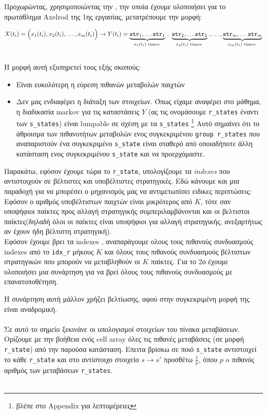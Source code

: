 	Προχωρώντας, χρησιμοποιώντας την  , την οποία έχουμε υλοποιήσει για το πρωτάθλημα Axelrod της 1ης εργασίας, μετατρέπουμε την μορφή:
	
	\[X(t_i)=\Bigl(x_1(t_i),x_2(t_i),\dotsc,x_m(t_i)\Bigr)\to Y(t_i)=\underbrace{\texttt{str}_1,\dots\texttt{str}_1}_{x_1(t_i) \text{ times }}\ , \ \underbrace{\texttt{str}_2,\dots\texttt{str}_2}_{x_2(t_i) \text{ times }}\ , \dots,\underbrace{\texttt{str}_m,\dots\texttt{str}_m}_{x_m(t_i) \text{ times }} \]
	\\
	Η μορφή αυτή εξυπηρετεί τους εξής σκοπούς:
	\begin{itemize}
		\item Είναι ευκολότερη η εύρεση πιθανών μεταβολών παιχτών
		\\
		\item Δεν μας ενδιαφέρει η διάταξη των στοιχείων. Όπως είχαμε αναφέρει στο μάθημα, η διαδικασία markov για τις καταστάσεις \(Y\) (ας τις ονομάσουμε \texttt{r\_states} έναντι των \texttt{s\_states}) είναι lumpable σε σχέση με τα
		\texttt{s\_states} \footnote{βλέπε στο Appendix για λεπτομέρειες} Αυτό σημαίνει ότι το άθροισμα των πιθανοτήτων μεταβολών ενος συγκεκριμένου \texttt{group r\_states} που αναπαριστούν ένα συγκεκριμένο \texttt{s\_state} είναι σταθερό από  οποιαδήποτε άλλη κατάσταση ενος συγκεκριμένου \texttt{s\_state} και να προερχόμαστε.
		
		
	\end{itemize}

	Παρακάτω, εφόσον έχουμε τώρα το \texttt{r\_state}, υπολογίζουμε τα \textit{indexes} που αντιστοιχούν σε βέλτιστες και υποβέλτιστες στρατηγικές. Εδώ κάνουμε και μια παραδοχή για να μπορέσει ο μηχανισμός μας να αντιμετωπίσει ειδικες περιπτώσεις: Εφόσον ο αριθμός υποβέλτιστων παιχτών είναι μικρότερος από \(Κ\), τότε σαν υποψήφιοι παίκτες προς αλλαγή στρατηγικής συμπεριλαμβάνονται και οι βελτιστοι παίκτες(δηλαδή όλοι οι παίκτες είναι υποψήφιοι για αλλαγή στρατηγικής, ανεξαρτήτως αν έχουν ήδη βέλτιστη στρατηγική).
\\
	
	
	Εφόσον έχουμε βρει τα indexes , αναπαράγουμε ολους τους πιθανούς συνδυασμούς indexes από το \texttt{idx\_r} μήκους \(K\) και όλους τους πιθανούς συνδυασμούς βέλτιστων στρατηγικών που μπορούν να μεταβληθούν οι \(Κ\) παίκτες. Για το 2ο έχουμε υλοποιήσει μια συνάρτηση για να βρεί όλους τους πιθανούς συνδυασμούς με επανατοποθέτηση.
	

	
Η συνάρτηση αυτή μάλλον χρήζει βελτίωσης, αφού στην συγκεκριμένη μορφή της είναι αναδρομική.
	\\
\\
	Σε αυτό το σημείο ξεκινάνε οι υπολογισμοί στοιχείων του πίνακα μεταβάσεων. Ορίζουμε με την βοήθεια ενός cell array όλες τις πιθανές μεταβάσεις (σε μορφή \texttt{r\_state}) από την παρούσα κατάσταση. Επειτα βρίσκω σε ποιό \texttt{s\_state} αντιστοιχεί το κάθε \texttt{r\_state} και στο αντίστοιχο στοιχείο \(s\to s'\) προσθέτω \(\frac{1}{p}\), όπου \(p\) o πιθανός αριθμός των μεταβάσεων \texttt{r\_states}.	
\\
\\

